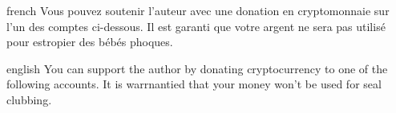 \documentclass[0_Main.tex]{subfiles}
\begin{document}

\begin{shownto}{french}
Vous pouvez soutenir l'auteur avec une donation en cryptomonnaie sur l'un des comptes ci-dessous. Il est garanti que votre argent ne sera pas utilisé pour estropier des bébés phoques.
\end{shownto}

\begin{shownto}{english}
You can support the author by donating cryptocurrency to one of the following accounts. It is warrnantied that your money won't be used for seal clubbing.
\end{shownto}
\end{document}
